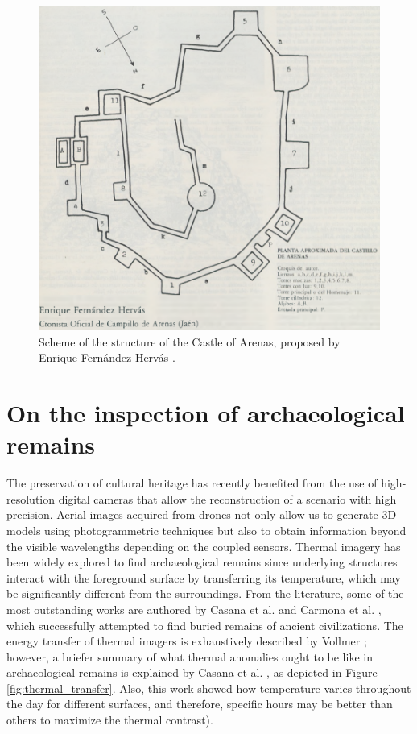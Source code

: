 \begin{figure}[ht]
  \centering
  \includegraphics[width=\linewidth]{figs/castle_puerta_arenas/castle_ideation_scheme.PNG}
  \caption{Scheme of the structure of the Castle of Arenas, proposed by Enrique Fernández Hervás \cite{fernandez_hervas_castillo_1986}.}
  \label{fig:castle_ideation_scheme}
\end{figure}

\section{On the inspection of archaeological remains}

The preservation of cultural heritage has recently benefited from the use of high-resolution digital cameras that allow the reconstruction of a scenario with high precision. Aerial images acquired from drones not only allow us to generate 3D models using photogrammetric techniques but also to obtain information beyond the visible wavelengths depending on the coupled sensors. Thermal imagery has been widely explored to find archaeological remains since underlying structures interact with the foreground surface by transferring its temperature, which may be significantly different from the surroundings. From the literature, some of the most outstanding works are authored by Casana et al. \cite{casana_archaeological_2017} and Carmona et al. \cite{salgado_carmona_assessing_2020}, which successfully attempted to find buried remains of ancient civilizations. The energy transfer of thermal imagers is exhaustively described by Vollmer \cite{vollmer_infrared_2017}; however, a briefer summary of what thermal anomalies ought to be like in archaeological remains is explained by Casana et al. \cite{casana_archaeological_2017}, as depicted in Figure \ref{fig:thermal_transfer}. Also, this work showed how temperature varies throughout the day for different surfaces, and therefore, specific hours may be better than others to maximize the thermal contrast).

